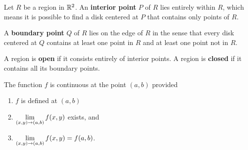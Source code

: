 \documentclass[mathNotesPreamble]{subfiles}
\begin{document}
  \begin{defn*}
    Let $R$ be a region in $\mathbb{R}^2$. An \textbf{interior point} $P$ of $R$ lies entirely within $R$, which means it is possible to find a disk centered at $P$ that contains only points of $R$.
    \vspace*{\baselineskip}
    
    A \textbf{boundary point} $Q$ of $R$ lies on the edge of $R$ in the sense that every disk centered at $Q$ contains at least one point in $R$ and at least one point not in $R$.
  \end{defn*}

  \begin{defn*}
    A region is \textbf{open} if it consists entirely of interior points. A region is \textbf{closed} if it contains all its boundary points.
  \end{defn*}

  \noindent

  \begin{defn*}[Continuity]
    The function $f$ is continuous at the point $(a,b)$ provided
    \begin{enumerate}
      \item $f$ is defined at $(a,b)$
      \item $\displaystyle\lim_{(x,y)\to (a,b)} f(x,y)$ exists, and 
      \item $\displaystyle\lim_{(x,y)\to (a,b)} f(x,y) = f(a,b)$.
    \end{enumerate}
  \end{defn*}

  \noindent

  

  \pagebreak
  
\end{document}
